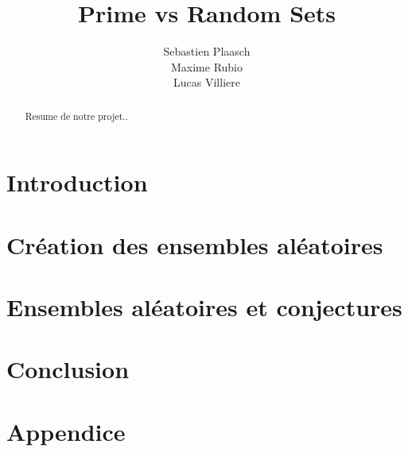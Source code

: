 \documentclass{article}
\begin{document}
\author{Sebastien Plaasch \\ Maxime Rubio  \\ Lucas Villiere}
\title{Prime vs Random Sets}
\maketitle
\newpage 
\begin{abstract}
    Resume de notre projet..
\end{abstract}
\newpage
\tableofcontents


\newpage

\section{Introduction}
    \label{sec:intro}


\section{Création des ensembles aléatoires}
    \label{sec:sec1}
    
    
    
		

\section{Ensembles aléatoires et conjectures}
    
		
		
		
\section{Conclusion}
    
\newpage




\clearpage
\appendix
	\section{Appendice}
		
		
\newpage
\printindex
\end{document}

